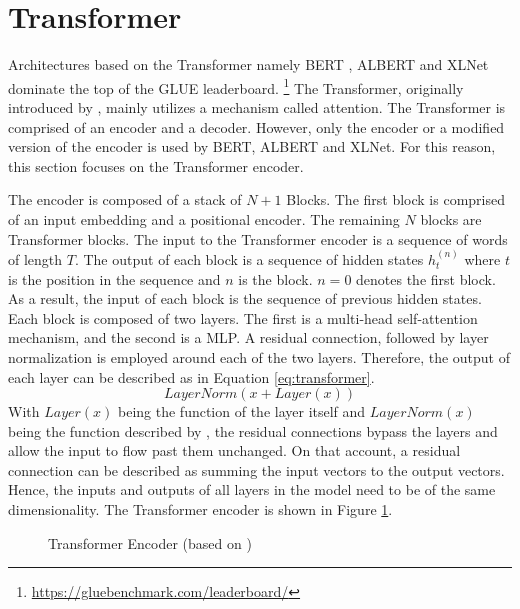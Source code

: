 	\section{Transformer}
	Architectures based on the Transformer namely BERT \autocite{Devlin.2018}, ALBERT \autocite{Lan.2019} and XLNet \autocite{Yang.2019} dominate the top of the GLUE leaderboard\autocite{Wang.2019}.  \footnote{\url{https://gluebenchmark.com/leaderboard/}} The Transformer, originally introduced by \cite{Vaswani.2017}, mainly utilizes a mechanism called attention. The Transformer is comprised of an encoder and a decoder. However, only the encoder or a modified version of the encoder is used by BERT, ALBERT and XLNet. For this reason, this section focuses on the Transformer encoder. 
	
	The encoder is composed of a stack of $N+1$ Blocks. The first block is comprised of an input embedding and a positional encoder. The remaining $N$ blocks are Transformer blocks. The input to the Transformer encoder is a sequence of words of length $T$. The output of each block is a sequence of hidden states $h_t^{(n)}$ where $t$ is the position in the sequence and $n$ is the block. $n=0$ denotes the first block. As a result, the input of each block is the sequence of previous hidden states. Each block is composed of two layers. The first is a multi-head self-attention mechanism, and the second is a \ac{MLP}. A residual connection\autocite{He.2015}, followed by layer normalization \autocite{Ba.2016} is employed around each of the two layers. Therefore, the output of each layer can be described as in Equation \eqref{eq:transformer}.
	\begin{equation}
		\label{eq:transformer}
		LayerNorm(x + Layer(x))
	\end{equation} 
	With $Layer(x)$ being the function of the layer itself and $LayerNorm(x)$ being the function described by \cite{He.2015}, the residual connections bypass the layers and allow the input to flow past them unchanged. On that account, a residual connection can be described as summing the input vectors to the output vectors. Hence, the inputs and outputs of all layers in the model need to be of the same dimensionality. The Transformer encoder is shown in Figure \ref{img:transformer}.
	\begin{figure}[H]
		\centering
		
		\caption{Transformer Encoder (based on \cite{Vaswani.2017})} \label{img:transformer}
	\end{figure}

